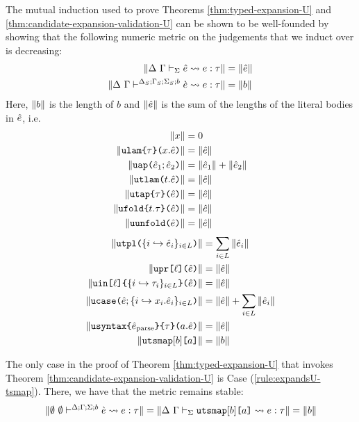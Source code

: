 The mutual induction used to prove Theorems \ref{thm:typed-expansion-U} and \ref{thm:candidate-expansion-validation-U} can be shown to be well-founded by showing that the following numeric metric on the judgements that we induct over is decreasing:
\begin{align*}
\Vert \Delta~\Gamma \vdash_{\Sigma} \hat{e} \leadsto e : \tau \Vert & = \Vert \hat{e} \Vert\\
\Vert \Delta~\Gamma\vdash^{\Delta_S; \Gamma_S; \Sigma_S; b} \grave{e} \leadsto e : \tau \Vert & = \Vert b \Vert
\end{align*}
Here, $\Vert b \Vert$ is the length of $b$ and $\Vert \hat{e} \Vert$ is the sum of the lengths of the literal bodies in $\hat{e}$, i.e. 
\begin{align*}
\Vert x \Vert & = 0\\
\Vert \texttt{ulam}\texttt{\{}\tau\texttt{\}(}x.\hat{e}\texttt{)} \Vert &= \Vert \hat{e} \Vert\\
\Vert \texttt{uap}\texttt{(}\hat{e}_1; \hat{e}_2\texttt{)} \Vert & = \Vert \hat{e}_1 \Vert + \Vert \hat{e}_2 \Vert\\
\Vert \texttt{utlam}\texttt{(}t.\hat{e}\texttt{)} \Vert & = \Vert \hat{e} \Vert\\
\Vert \texttt{utap}\texttt{\{}\tau\texttt{\}(}\hat{e}\texttt{)} \Vert & = \Vert \hat{e} \Vert\\
\Vert \texttt{ufold}\texttt{\{}t.\tau\texttt{\}(}\hat{e}\texttt{)} \Vert & = \Vert \hat{e} \Vert\\
\Vert \texttt{uunfold}\texttt{(}\hat{e}\texttt{)} \Vert & = \Vert \hat{e} \Vert\\
\end{align*}
\begin{align*}
\Vert \texttt{utpl}\texttt{(}\{i \hookrightarrow \hat{e}_{i}\}_{i \in L}\texttt{)} \Vert & = \sum_{i \in L} \Vert \hat{e}_i \Vert\\
\Vert \texttt{upr}\texttt{[}\ell\texttt{](}\hat{e}\texttt{)} \Vert & = \Vert \hat{e} \Vert\\
\Vert \texttt{uin}\texttt{[}\ell\texttt{]\{}\{i \hookrightarrow \tau_{i}\}_{i \in L}\texttt{\}(}\hat{e}\texttt{)} \Vert & = \Vert \hat{e} \Vert\\
\Vert \texttt{ucase}\texttt{(}\hat{e}; \{i \hookrightarrow x_{i}.\hat{e}_{i}\}_{i \in L}\texttt{)} \Vert & = \Vert \hat{e} \Vert + \sum_{i \in L} \Vert \hat{e}_i \Vert\\
\Vert \texttt{usyntax}\texttt{\{}\hat{e}_\text{parse}\texttt{\}\{}\tau\texttt{\}(}a.\hat{e}\texttt{)} \Vert & = \Vert \hat{e} \Vert\\
\Vert \texttt{utsmap}[b]\texttt{[}a\texttt{]} \Vert & = \Vert b \Vert
\end{align*}

The only case in the proof of Theorem \ref{thm:typed-expansion-U} that invokes Theorem \ref{thm:candidate-expansion-validation-U} is Case (\ref{rule:expandsU-tsmap}). There, we have that the metric remains stable: \[\Vert \emptyset~\emptyset\vdash^{\Delta; \Gamma; \Sigma; b} \grave{e} \leadsto e : \tau \Vert = \Vert \Delta~\Gamma \vdash_{\Sigma} \texttt{utsmap}[b]\texttt{[}a\texttt{]} \leadsto e : \tau \Vert=\Vert b \Vert\]

